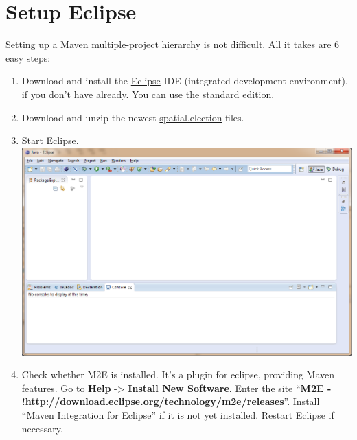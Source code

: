 
\section{Setup Eclipse}

Setting up a Maven multiple-project hierarchy is not difficult. All it
takes are 6 easy steps:

\begin{enumerate}
\def\labelenumi{\arabic{enumi}.}
\item
  Download and install the
  \href{https://www.eclipse.org/downloads/}{Eclipse}-IDE (integrated
  development environment), if you don't have already. You can use the
  standard edition.
\item
  Download and unzip the newest
  \href{https://github.com/a-d/spatial.election/archive/master.zip}{spatial.election}
  files.
\item
  Start Eclipse. \includegraphics[width=1.1\textwidth]{../img/GMXSI1f.png}
\item
  Check whether M2E is installed. It's a plugin for eclipse, providing
  Maven features. Go to \textbf{Help} -\textgreater{} \textbf{Install
  New Software}. Enter the site ``\textbf{M2E -
  !http://download.eclipse.org/technology/m2e/releases}''. Install
  ``Maven Integration for Eclipse'' if it is not yet installed. Restart
  Eclipse if necessary.


\end{enumerate}
